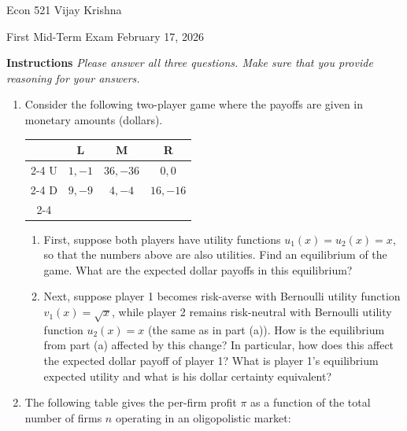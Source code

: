 \documentclass[11pt]{article}
\begin{document}
\noindent Econ 521 \hfill Vijay Krishna

\noindent First Mid-Term Exam \hfill February 17, 2026

\vspace{0.5em}

\textbf{Instructions} \textit{Please answer all three questions. Make sure that you provide reasoning for your answers.}


\begin{enumerate}[leftmargin=*, label=\arabic*.]
    \item Consider the following two-player game where the payoffs are given in monetary amounts (dollars).

    \begin{center}
    \renewcommand{\arraystretch}{1.2}
    \begin{tabular}{c|c|c|c|}
         \multicolumn{1}{c}{} & \multicolumn{1}{c}{L} & \multicolumn{1}{c}{M} & \multicolumn{1}{c}{R} \\ \cline{2-4}
         U & $1, -1$ & $36, -36$ & $0, 0$ \\ \cline{2-4}
         D & $9, -9$ & $4, -4$ & $16, -16$ \\ \cline{2-4}
    \end{tabular}
    \end{center}

    \begin{enumerate}[label=(\alph*)]
        \item First, suppose both players have utility functions $u_1(x) = u_2(x) = x$, so that the numbers above are also utilities. Find an equilibrium of the game. What are the expected dollar payoffs in this equilibrium?
        
        \item Next, suppose player 1 becomes risk-averse with Bernoulli utility function $v_1(x) = \sqrt{x}$, while player 2 remains risk-neutral with Bernoulli utility function $u_2(x) = x$ (the same as in part (a)). How is the equilibrium from part (a) affected by this change? In particular, how does this affect the expected dollar payoff of player 1? What is player 1's equilibrium expected utility and what is his dollar certainty equivalent?
    \end{enumerate}

    \item The following table gives the per-firm profit $\pi$ as a function of the total number of firms $n$ operating in an oligopolistic market:
    

\end{enumerate}
\end{document}
